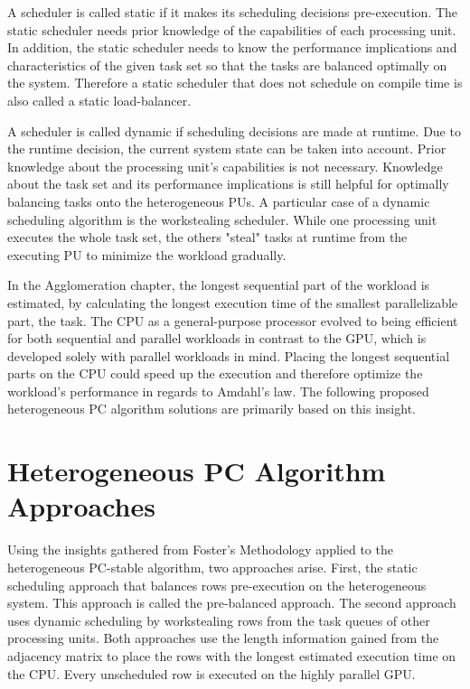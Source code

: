 A scheduler is called static if it makes its scheduling decisions pre-execution. The static scheduler needs prior knowledge of the capabilities of each processing unit. In addition, the static scheduler needs to know the performance implications and characteristics of the given task set so that the tasks are balanced optimally on the system. Therefore a static scheduler that does not schedule on compile time is also called a static load-balancer.

A scheduler is called dynamic if scheduling decisions are made at runtime. Due to the runtime decision, the current system state can be taken into account. Prior knowledge about the processing unit's capabilities is not necessary. Knowledge about the task set and its performance implications is still helpful for optimally balancing tasks onto the heterogeneous PUs.
A particular case of a dynamic scheduling algorithm is the workstealing scheduler. While one processing unit executes the whole task set, the others "steal" tasks at runtime from the executing PU to minimize the workload gradually.

In the Agglomeration chapter, the longest sequential part of the workload is estimated, by calculating the longest execution time of the smallest parallelizable part, the task. The CPU as a general-purpose processor evolved to being efficient for both sequential and parallel workloads in contrast to the GPU, which is developed solely with parallel workloads in mind. Placing the longest sequential parts on the CPU could speed up the execution and therefore optimize the workload's performance in regards to Amdahl's law. The following proposed heterogeneous PC algorithm solutions are primarily based on this insight.

\section{Heterogeneous PC Algorithm Approaches}
Using the insights gathered from Foster's Methodology applied to the heterogeneous PC-stable algorithm, two approaches arise. First, the static scheduling approach that balances rows pre-execution on the heterogeneous system. This approach is called the pre-balanced approach. The second approach uses dynamic scheduling by workstealing rows from the task queues of other processing units. Both approaches use the length information gained from the adjacency matrix to place the rows with the longest estimated execution time on the CPU. Every unscheduled row is executed on the highly parallel GPU.

